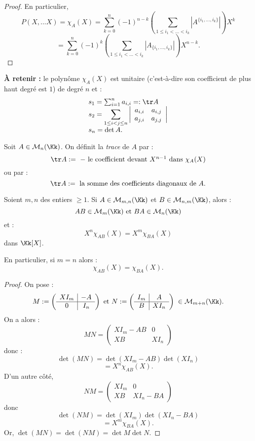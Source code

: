 \documentclass[class=report,crop=false]{standalone}
\begin{document}
\begin{exemple}[s]
\begin{proof}
En particulier, \[P(X,...X) = \chi_A(X) = \sum_{k=0}^n  (-1)^{n-k}(\sum_{1 \le i_1 <...<i_k}|A^{\{i_1,...,i_k\}} |)X^k\]
\[= \sum_{k=0}^n (-1)^k (\sum_{1 \le i_1 <...<i_k}|A_{\{i_1,...,i_k\}} |)X^{n-k}.\] 
\end{proof}

{\bf \`A retenir : } le polynôme $\chi_A(X)$ est unitaire (c'est-à-dire son coefficient de plus haut degré est $1$)
 de degré $n$ et :
\[\begin{array}{l}
s_1 = \sum_{i=1}^n a_{i,i} = : \tr A\\
s_2 = \displaystyle \sum_{1 \le i < j \le n} \left|\begin{array}{cc}
a_{i,i}&a_{i,j}\\
a_{j,i}&a_{j,j}
\end{array}\right|\\
s_n = \det A.
\end{array}
\]\end{exemple}

\begin{definition}
Soit $A \in \mathcal{M}_n(\Kk)$. On définit la {\it trace} de $A$ par :
\[\tr A := \mbox{ $-$ le coefficient devant $X^{n-1}$ dans $\chi_A(X)$}\]
ou par :
\[\tr A := \mbox{ la somme des coefficients diagonaux de $A$.}\]
\end{definition}

\begin{theoreme}
Soient $m,n$ des entiers $\ge 1$. Si $A \in \mathcal{M}_{m,n}(\Kk)$ et $B \in \mathcal{M}_{n,m}(\Kk)$, alors :
\[AB \in \mathcal{M}_m(\Kk) \text{ et } BA \in \mathcal{M}_{n}(\Kk)\] 
et :
\[X^n\chi_{AB}(X) = X^m\chi_{BA}(X)\]
dans $\Kk[X]$.

En particulier, si $m=n$ alors :\[\chi_{AB} (X) = \chi_{BA}(X) .\]
\end{theoreme}
\begin{proof}
On pose :
\[M:=\left(\begin{array}{c|c}
XI_m & -A\\\hline
0 & I_n
\end{array}\right) \text{ et } N := \left(\begin{array}{c|c}
I_m & A\\\hline
B & XI_n
\end{array}\right) \; \in \mathcal{M}_{m+n}(\Kk) .\]
On a alors :
\[MN = \left(\begin{array}{c|c}
XI_m -AB& 0\\\hline
XB & XI_n
\end{array}\right)\]
donc :
\[\det (MN) = \det (X I_m -AB) \det (X I_n) \]
\[= X^n\chi_{AB}(X) .\] D'un autre côté, \[ NM = \left(\begin{array}{c|c}
XI_m & 0\\\hline
XB & XI_n-BA
\end{array}\right)\]
donc \[\det (NM) = \det (XI_m)\det(X I_n-BA) \]\[ = X^m \chi_{BA}(X) .\]
Or, $\det (MN) = \det (NM) = \det M \det N$.
\end{proof}
\end{document}

